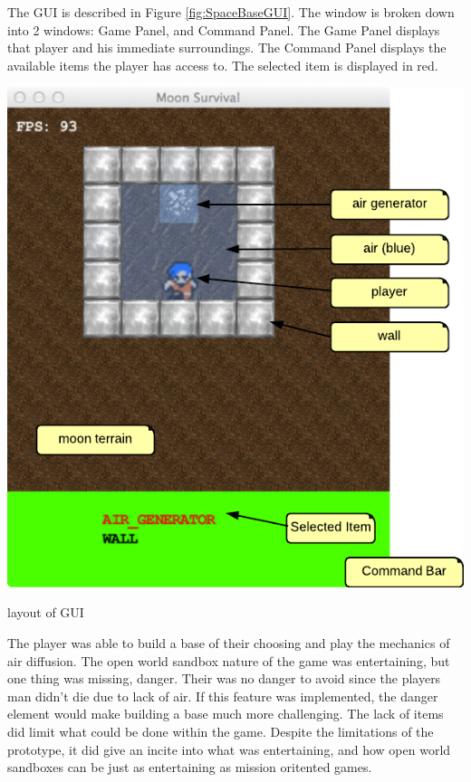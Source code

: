 The GUI is described in Figure \ref{fig:SpaceBaseGUI}.
The window is broken down into 2 windows: Game Panel, and Command Panel.
The Game Panel displays that player and his immediate surroundings.
The Command Panel displays the available items the player has access to.
The selected item is displayed in red.

\begin{marginfigure}
	\includegraphics{res/space_base_prototype/MoonSurvivalGUI.pdf}
	\caption{layout of GUI}
	\label{fig:SpaceBaseGUI}
\end{marginfigure}

The player was able to build a base of their choosing and play the mechanics of air diffusion.
The open world sandbox nature of the game was entertaining, but one thing was missing, danger.
Their was no danger to avoid since the players man didn't die due to lack of air.
If this feature was implemented, the danger element would make building a base much more challenging.
The lack of items did limit what could be done within the game. 
Despite the limitations of the prototype, it did give an incite into what was entertaining, and how open world sandboxes can be just as entertaining as mission oritented games.


